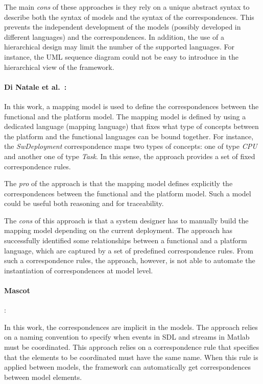 The main \emph{cons} of these approaches is they rely on a unique abstract syntax to describe both the syntax of models and the syntax of the correspondences. This prevents the independent development of the models (possibly developed in different languages) and the correspondences. In addition, the use of a hierarchical design may limit the number of the supported languages. For instance, the UML sequence diagram could not be easy to introduce in the hierarchical view of the framework.

\paragraph{Di Natale et al.~\cite{dinatale}:}
In this work, a mapping model is used to define the correspondences between the functional and the platform model. The mapping model is defined by using a dedicated language (\ie mapping language) that fixes what type of concepts between the platform and the functional languages can be bound together. For instance, the \emph{SwDeployment} correspondence maps two types of concepts: one of type \emph{CPU} and another one of type \emph{Task}. In this sense, the approach provides a set of fixed correspondence rules. 

The \emph{pro} of the approach is that the mapping model defines explicitly the correspondences between the functional and the platform model. Such a model could be useful both reasoning and for traceability. 

The \emph{cons} of this approach is that a system designer has to manually build the mapping model depending on the current deployment. The approach has successfully identified some relationships between a functional and a platform language, which are captured by a set of predefined correspondence rules. From such a correspondence rules, the approach, however, is not able to automate the instantiation of correspondences at model level. 

{\paragraph{Mascot~\cite{mascotbib}}:} In this work, the correspondences are implicit in the models. The approach relies on a naming convention to specify when events in SDL and streams in Matlab must be coordinated. This approach relies on a correspondence rule that specifies that the elements to be coordinated must have the same name. When this rule is applied between models, the framework can automatically get correspondences between model elements.

